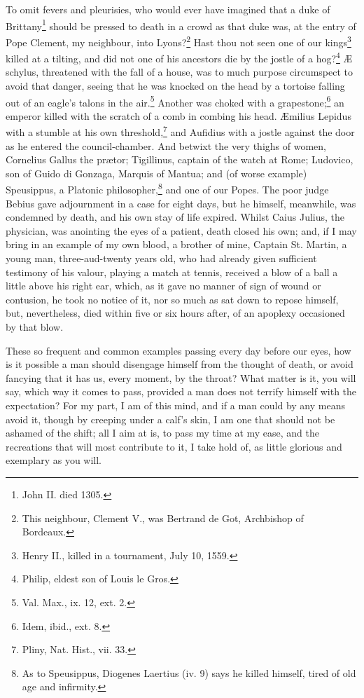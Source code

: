 To omit fevers and pleurisies, who would ever have imagined that a
duke of Brittany\footnote{John II. died 1305.} should be pressed to
death in a crowd as that duke was, at the entry of Pope Clement, my
neighbour, into Lyons?\footnote{This neighbour, Clement V., was
Bertrand de Got, Archbishop of Bordeaux.} Hast thou not seen one of
our kings\footnote{Henry II., killed in a tournament, July 10, 1559.}
killed at a tilting, and did not one of his ancestors die by the
jostle of a hog?\footnote{Philip, eldest son of Louis le Gros.} \AE
schylus, threatened with the fall of a house, was to much purpose
circumspect to avoid that danger, seeing that he was knocked on the
head by a tortoise falling out of an eagle's talons in the
air.\footnote{Val. Max., ix. 12, ext. 2.} Another was choked with a
grapestone;\footnote{Idem, ibid., ext. 8.} an emperor killed with the
scratch of a comb in combing his head. \AE milius Lepidus with a
stumble at his own threshold,\footnote{Pliny, Nat. Hist., vii. 33.}
and Aufidius with a jostle against the door as he entered the
council-chamber. And betwixt the very thighs of women, Cornelius
Gallus the pr\ae tor; Tigillinus, captain of the watch at Rome;
Ludovico, son of Guido di Gonzaga, Marquis of Mantua; and (of worse
example) Speusippus, a Platonic philosopher,\footnote{As to
Speusippus, Diogenes Laertius (iv. 9) says he killed himself, tired of
old age and infirmity.} and one of  our Popes. The poor judge
Bebius gave adjournment in a case for eight days, but he himself,
meanwhile, was condemned by death, and his own stay of life expired.
Whilst Caius Julius, the physician, was anointing the eyes of a
patient, death closed his own; and, if I may bring in an example of my
own blood, a brother of mine, Captain St. Martin, a young man,
three-aud-twenty years old, who had already given sufficient testimony
of his valour, playing a match at tennis, received a blow of a ball a
little above his right ear, which, as it gave no manner of sign of
wound or contusion, he took no notice of it, nor so much as sat down
to repose himself, but, nevertheless, died within five or six hours
after, of an apoplexy occasioned by that blow.

These so frequent and common examples passing every day before our
eyes, how is it possible a man should disengage himself from the
thought of death, or avoid fancying that it has us, every moment, by
the throat? What matter is it, you will say, which way it comes to
pass, provided a man does not terrify himself with the expectation?
For my part, I am of this mind, and if a man could by any means avoid
it, though by creeping under a calf's skin, I am one that should not
be ashamed of the shift; all I aim at is, to pass my time at my ease,
and the recreations that will most contribute to it, I take hold of,
as little glorious and exemplary as you will.

